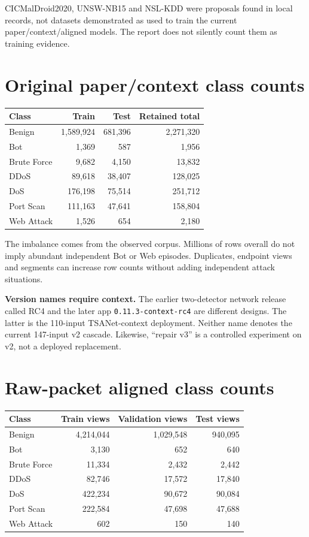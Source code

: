 \documentclass[11pt,a4paper,oneside]{report}
\newcommand{\code}[1]{\nolinkurl{#1}}
\begin{document}
CICMalDroid2020, UNSW-NB15 and NSL-KDD were proposals found in local records, not datasets demonstrated as used to train the current paper/context/aligned models. The report does not silently count them as training evidence.

\section{Original paper/context class counts}

{\small
\begin{longtable}{@{}lrrr@{}}
\toprule
Class & Train & Test & Retained total\\\midrule\endhead
Benign & 1,589,924 & 681,396 & 2,271,320\\
Bot & 1,369 & 587 & 1,956\\
Brute Force & 9,682 & 4,150 & 13,832\\
DDoS & 89,618 & 38,407 & 128,025\\
DoS & 176,198 & 75,514 & 251,712\\
Port Scan & 111,163 & 47,641 & 158,804\\
Web Attack & 1,526 & 654 & 2,180\\
\bottomrule\end{longtable}
}

The imbalance comes from the observed corpus. Millions of rows overall do not imply abundant independent Bot or Web episodes. Duplicates, endpoint views and segments can increase row counts without adding independent attack situations.

\textbf{Version names require context.} The earlier two-detector network release called RC4 and the later app \code{0.11.3-context-rc4} are different designs. The latter is the 110-input TSANet-context deployment. Neither name denotes the current 147-input v2 cascade. Likewise, ``repair v3'' is a controlled experiment on v2, not a deployed replacement.

\section{Raw-packet aligned class counts}

{\small
\begin{longtable}{@{}lrrr@{}}
\toprule
Class & Train views & Validation views & Test views\\\midrule\endhead
Benign & 4,214,044 & 1,029,548 & 940,095\\
Bot & 3,130 & 652 & 640\\
Brute Force & 11,334 & 2,432 & 2,442\\
DDoS & 82,746 & 17,572 & 17,840\\
DoS & 422,234 & 90,672 & 90,084\\
Port Scan & 222,584 & 47,698 & 47,688\\
Web Attack & 602 & 150 & 140\\
\bottomrule\end{longtable}
}
\end{document}
